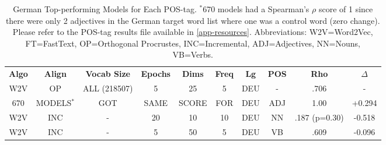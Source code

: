 \begin{table}[h]
\centering
\begin{tabular}{cccccccccc} 
\toprule
\textbf{ Algo } & \textbf{ Align } & \textbf{ Vocab Size } & \textbf{ Epochs } & \textbf{ Dims } & \textbf{ Freq } & \textbf{ Lg } & \textbf{ POS } & \textbf{ Rho } & \textbf{ $\Delta$ }  \\
W2V             & OP               & ALL (218507)          & 5                 & 25              & 5              & DEU           & -              & .706           & -               \\
670             & MODELS$^*$       & GOT                   & SAME              & SCORE           & FOR            & DEU           & ADJ            & 1.00           & +0.294          \\
W2V             & INC              & -                     & 20                & 10              & 10             & DEU           & NN             & .187 (p=0.30)  & -0.518          \\
W2V             & INC              & -                     & 5                 & 50              & 5              & DEU           & VB             & .609           & -0.096          \\
\bottomrule
\end{tabular}
\caption{German Top-performing Models for Each POS-tag. $^*$670 models had a Spearman's $\rho$ score of 1 since there were only 2 adjectives in the German target word list where one was a control word (zero change). Please refer to the POS-tag results file available in \autoref{app-resources}. Abbreviations: W2V=Word2Vec, FT=FastText, OP=Orthogonal Procrustes, INC=Incremental, ADJ=Adjectives, NN=Nouns, VB=Verbs.}
\label{tab:deu-posresults}
\end{table}


